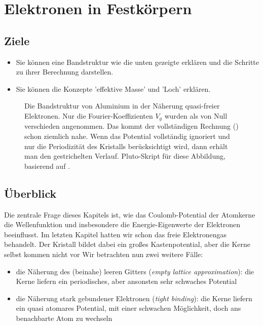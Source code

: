 \renewcommand{\chapterauthors}{Markus Lippitz}
\renewcommand{\lastmod}{25. April  2023}
 
\chapter{Elektronen in Festkörpern}




\section{Ziele}
 


\begin{itemize}  
\item Sie können eine Bandstruktur wie die unten gezeigte erklären und die Schritte zu ihrer Berechnung darstellen. 
\item Sie können die Konzepte 'effektive Masse' und 'Loch' erklären.
\end{itemize}


\begin{figure}
    \caption{Die Bandstruktur von Aluminium in der Näherung quasi-freier Elektronen. Nur die Fourier-Koeffizienten $V_g$ wurden als von Null verschieden angenommen.  Das kommt der vollständigen Rechnung (\cite{Segall1961}) schon ziemlich nahe. Wenn das Potential vollständig ignoriert und nur die Periodizität des Kristalls berücksichtigt wird, dann erhält man den gestrichelten Verlauf. Pluto-Skript für diese Abbildung, basierend auf \cite{Polakovic_cmpm3}. \label{fig:3_al_empty_lattice}}
\end{figure} 
  

\section{Überblick}

Die zentrale Frage dieses Kapitels ist, wie das Coulomb-Potential der Atomkerne die Wellenfunktion und insbesondere die Energie-Eigenwerte der Elektronen beeinflusst. Im letzten Kapitel hatten wir schon das freie Elektronengas behandelt. Der Kristall bildet dabei ein großes Kastenpotential, aber die Kerne selbst kommen nicht vor
Wir betrachten nun zwei weitere Fälle: 
\begin{itemize}
    \item die Näherung des (beinahe) leeren Gitters (\textit{empty lattice approximation}): die Kerne liefern ein periodisches, aber ansonsten sehr schwaches Potential
    \item die Näherung stark gebundener Elektronen (\textit{tight binding}): die Kerne liefern ein quasi atomares Potential, mit einer schwachen Möglichkeit, doch ans benachbarte Atom zu wechseln
\end{itemize}

